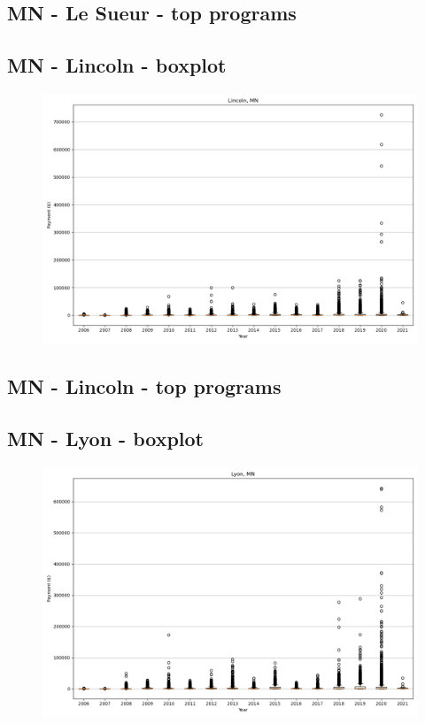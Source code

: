 \subsection*{MN - Le Sueur - top programs}

\newpage
\subsection*{MN - Lincoln - boxplot}
\begin{figure}[h]
\centering
\includegraphics[width=7in]{../output/boxplots/counties/Lincoln-MN_boxplot.png}
\end{figure}


\subsection*{MN - Lincoln - top programs}

\newpage
\subsection*{MN - Lyon - boxplot}
\begin{figure}[h]
\centering
\includegraphics[width=7in]{../output/boxplots/counties/Lyon-MN_boxplot.png}
\end{figure}


